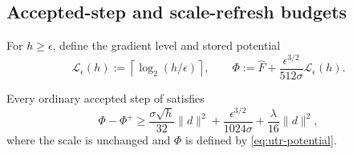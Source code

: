 \documentclass{article}
\begin{document}
\subsection{Accepted-step and scale-refresh budgets}

For $h\ge\epsilon$, define the gradient level and stored potential
\begin{equation}\label{eq:utr-potential}
 \mathcal L_\epsilon(h):=\left\lceil\log_2(h/\epsilon)\right\rceil,
 \qquad
 \Phi:=\widehat F+\frac{\epsilon^{3/2}}{512\sigma}
                           \mathcal L_\epsilon(h).
\end{equation}


\begin{lemma}
\label{lem:utr-descent}
Every ordinary accepted step of
 satisfies
\begin{equation}\label{eq:utr-potential-decrease}
 \Phi-\Phi^+
 \ge\frac{\sigma\sqrt h}{32}\|d\|^2
       +\frac{\epsilon^{3/2}}{1024\sigma}
       +\frac{\lambda}{16}\|d\|^2,
\end{equation}
where the scale is unchanged and $\Phi$ is defined by
\eqref{eq:utr-potential}.
\end{lemma}
\end{document}
